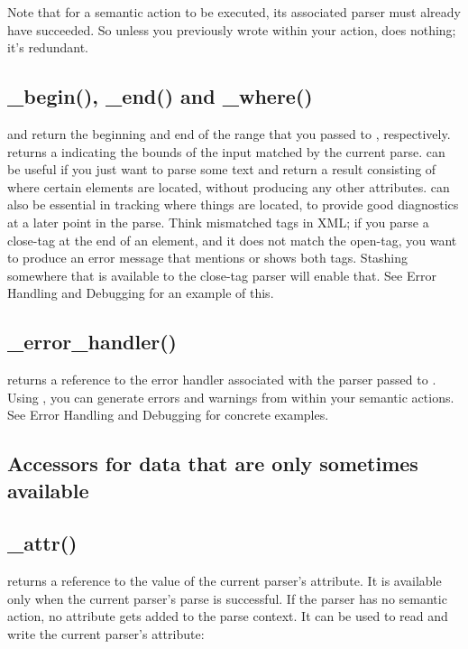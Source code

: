 \documentclass{MyBook}
\begin{document}
Note that for a semantic action to be executed, its associated parser must already have succeeded. So unless you previously wrote  within your action,  does nothing; it's redundant.

\subsection{\_begin(), \_end() and \_where()}

 and  return the beginning and end of the range that you passed to , respectively.  returns a  indicating the bounds of the input matched by the current parse.  can be useful if you just want to parse some text and return a result consisting of where certain elements are located, without producing any other attributes.  can also be essential in tracking where things are located, to provide good diagnostics at a later point in the parse. Think mismatched tags in XML; if you parse a close-tag at the end of an element, and it does not match the open-tag, you want to produce an error message that mentions or shows both tags. Stashing  somewhere that is available to the close-tag parser will enable that. See Error Handling and Debugging for an example of this.

\subsection{\_error\_handler()}

 returns a reference to the error handler associated with the parser passed to . Using , you can generate errors and warnings from within your semantic actions. See Error Handling and Debugging for concrete examples.

\subsection{Accessors for data that are only sometimes available}

\subsection{\_attr()}

 returns a reference to the value of the current parser's attribute. It is available only when the current parser's parse is successful. If the parser has no semantic action, no attribute gets added to the parse context. It can be used to read and write the current parser's attribute:
\end{document}
